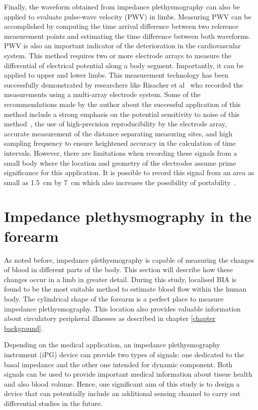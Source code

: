 Finally, the waveform obtained from impedance plethysmography can also be applied to evaluate pulse-wave velocity (PWV) in limbs. Measuring PWV can be accomplished by computing the time arrival difference between two reference measurement points and estimating the time difference between both waveforms. PWV is also an important indicator of the deterioration in the cardiovascular system. This method requires two or more electrode arrays to measure the differential of electrical potential along a body segment. Importantly, it can be applied to upper and lower limbs. This measurement technology has been successfully demonstrated by researchers like Risacher et al~\cite{risacher1993impedance} who recorded the measurements using a multi-array electrode system. Some of the recommendations made by the author about the successful application of this method include a strong emphasis on the potential sensitivity to noise of this method~\cite{risacher1992computation}, the use of high-precision reproducibility by the electrode array, accurate measurement of the distance separating measuring sites, and high sampling frequency to ensure heightened accuracy in the calculation of time intervals. However, there are limitations when recording these signals from a small body where the location and geometry of the electrodes assume prime significance for this application. It is possible to record this signal from an area as small as \SI{1.5}{\cm} by \SI{7}{\cm} which also increases the possibility of portability~\cite{cho2009bio}. 

\section{Impedance plethysmography in the forearm}
\label{section impedance plethysmography}
As noted before, impedance plethysmography is capable of measuring the changes of blood in different parts of the body. This section will describe how these changes occur in a limb in greater detail. During this study, localised BIA is found to be the most suitable method to estimate blood flow within the human body. The cylindrical shape of the forearm is a perfect place to measure impedance plethysmography. This location also provides valuable information about circulatory peripheral illnesses as described in chapter \ref{chapter background}.

Depending on the medical application, an impedance plethysmography instrument (iPG) device can provide two types of signals: one dedicated to the basal impedance and the other one intended for dynamic component. Both signals can be used to provide important medical information about tissue health and also blood volume. Hence, one significant aim of this study is to design a device that can potentially include an additional sensing channel to carry out differential studies in the future.


